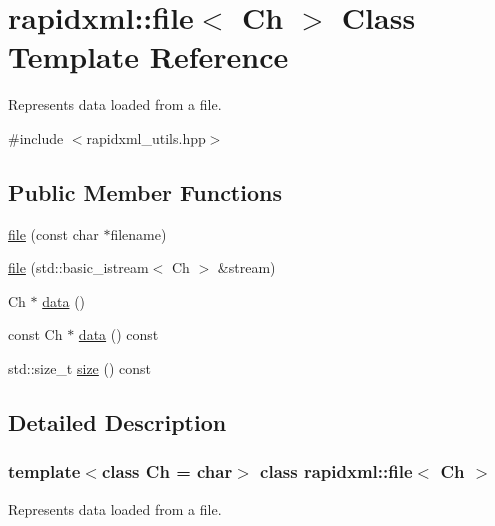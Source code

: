 \hypertarget{classrapidxml_1_1file}{
\section{rapidxml::file$<$ Ch $>$ Class Template Reference}
\label{d2/d66/classrapidxml_1_1file}
}


Represents data loaded from a file.  




{\ttfamily \#include $<$rapidxml\_\-utils.hpp$>$}

\subsection*{Public Member Functions}
\begin{DoxyCompactItemize}
\item 
\hyperlink{classrapidxml_1_1file_ae881a3cab1fe7152d45c92a8d7606cb3}{file} (const char $\ast$filename)
\item 
\hyperlink{classrapidxml_1_1file_a90707ccd991cc392dcf4bef37eed9d1f}{file} (std::basic\_\-istream$<$ Ch $>$ \&stream)
\item 
Ch $\ast$ \hyperlink{classrapidxml_1_1file_af1c71d65862c7af14e4708e32a80c1de}{data} ()
\item 
const Ch $\ast$ \hyperlink{classrapidxml_1_1file_aceb8f5ebd577c946a74b1ea3e2e0c576}{data} () const 
\item 
std::size\_\-t \hyperlink{classrapidxml_1_1file_a20191d167c6e00a88a44ca9a3a54e1c5}{size} () const 
\end{DoxyCompactItemize}


\subsection{Detailed Description}
\subsubsection*{template$<$class Ch = char$>$ class rapidxml::file$<$ Ch $>$}

Represents data loaded from a file. 

